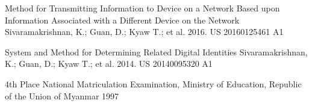 

\begin{cvpatents}

  \cvpatent
    {Method for Transmitting Information to Device on a Network Based upon Information Associated with a Different Device on the Network} %
    {Sivaramakrishnan, K.; Guan, D.; Kyaw T.; et al. 2016.} %
    {US 20160125461 A1} %

  \cvpatent
    {System and Method for Determining Related Digital Identities} %
    {Sivaramakrishnan, K.; Guan, D.; Kyaw T.; et al. 2014.} %
    {US 20140095320 A1} %

  \cvpatent
    {4th Place} %
    {National Matriculation Examination, Ministry of Education, Republic of the Union of Myanmar} %
    {1997} %

\end{cvpatents}
